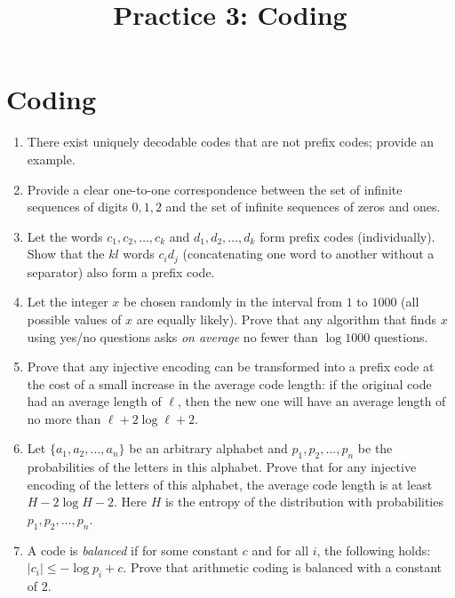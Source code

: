 \documentclass[a4paper]{article}
\title{Practice 3: Coding}
\date{\DTMdate{2024-10-23}}
\author{}
\begin{document}
\maketitle

\section*{Coding}

\begin{enumerate}
    \item
    There exist uniquely decodable codes that are not prefix codes; provide an example.

    \item Provide a clear one-to-one correspondence between the set of infinite sequences of digits \(0,1,2\) and the set of infinite sequences of zeros and ones.

    \item Let the words \(c_1, c_2, \ldots, c_k\) and \(d_1, d_2, \ldots, d_k\) form prefix codes (individually). Show that the \(kl\) words \(c_i d_j\) (concatenating one word to another without a separator) also form a prefix code.

    \item Let the integer \(x\) be chosen randomly in the interval from \(1\) to \(1000\) (all possible values of \(x\) are equally likely). Prove that any algorithm that finds \(x\) using yes/no questions asks \emph{on average} no fewer than \(\log 1000\) questions.

    \item Prove that any injective encoding can be transformed into a prefix code at the cost of a small increase in the average code length: if the original code had an average length of \(\ell\), then the new one will have an average length of no more than \(\ell + 2\log{\ell} + 2\).

    \item Let \(\{a_1, a_2, \ldots, a_n\}\) be an arbitrary alphabet and \(p_1, p_2, \ldots, p_n\) be the probabilities of the letters in this alphabet. Prove that for any injective encoding of the letters of this alphabet, the average code length is at least \(H - 2 \log{H} - 2\). Here \(H\) is the entropy of the distribution with probabilities \(p_1, p_2, \ldots, p_n\).

    \item     A code is \emph{balanced} if for some constant \(c\) and for
    all \(i\), the following holds: \(|c_i| \le - \log p_i + c\).
    Prove that arithmetic coding is balanced with a constant of \(2\).


\end{enumerate}
\end{document}
